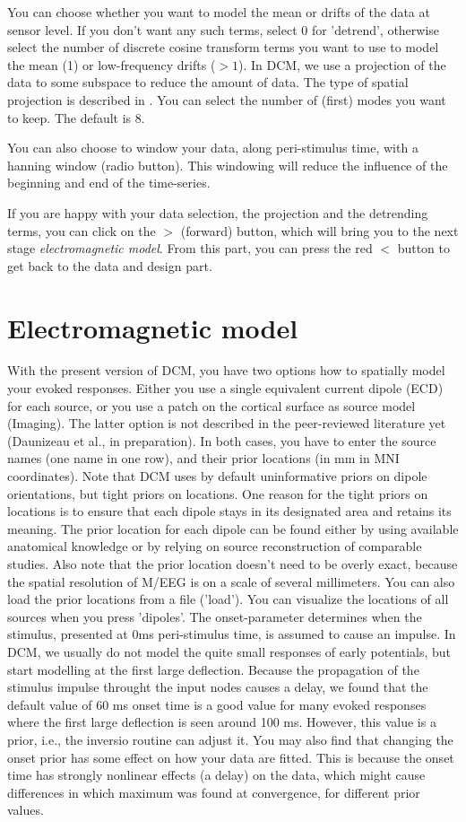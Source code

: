 You can choose whether you want to model the mean or
drifts of the data at sensor level. If you don't want any such terms,
select 0 for 'detrend', otherwise select the number of discrete cosine
transform terms you want to use to model the mean (1) or low-frequency
drifts ($> 1$). In DCM, we use a projection of the data to some
subspace to reduce the amount of data. The type of spatial projection
is described in \cite{matthias_dcm_constraints}. You can select the
number of (first) modes you want to keep. The default is 8.

You can also choose to window your data, along peri-stimulus time,
with a hanning window (radio button). This windowing will reduce the
influence of the beginning and end of the time-series. 

If you are happy with your data selection, the projection and the detrending
terms, you can click on the $>$ (forward) button, which will bring you to
the next stage \textit{electromagnetic model}. From this part, you can
press the red $<$ button to get back to the data and design part.

\section{Electromagnetic model}
With the present version of DCM, you have two options how to spatially
model your evoked responses. Either you use a single equivalent
current dipole (ECD) for each source, or you use a patch on the
cortical surface as source model (Imaging). The latter option is not
described in the peer-reviewed literature yet (Daunizeau et al., in
preparation). In both cases, you have to enter the source names (one
name in one row), and their prior locations (in mm in MNI
coordinates). Note that DCM uses by default uninformative priors on  
dipole orientations, but tight priors on locations. One reason for the
tight priors on locations is to ensure that each dipole stays in its
designated area and retains its meaning. The prior location for each
dipole can be found either by using available anatomical knowledge or
by relying on source reconstruction of comparable studies. Also note
that the prior location doesn't need to be overly exact, because the
spatial resolution of M/EEG is on a scale of several millimeters. 
You can also load the prior locations from a file
('load'). You can visualize the locations of all sources when you
press 'dipoles'. The onset-parameter determines when the stimulus,
presented at 0ms peri-stimulus time, is assumed to cause an
impulse. In DCM, we usually do not model the quite small responses of
early potentials, but start modelling at the first large
deflection. Because the propagation of the stimulus impulse throught
the input nodes causes a delay, we found that the default value of 60
ms onset time is a good value for many evoked responses where the
first large deflection is seen around 100 ms. However, this value is a
prior, i.e., the inversio routine can adjust it. You may also find
that changing the onset prior has some effect on how your data are
fitted. This is because the onset time has strongly nonlinear effects
(a delay) on the data, which might cause differences in which maximum
was found at convergence, for different prior values. 

